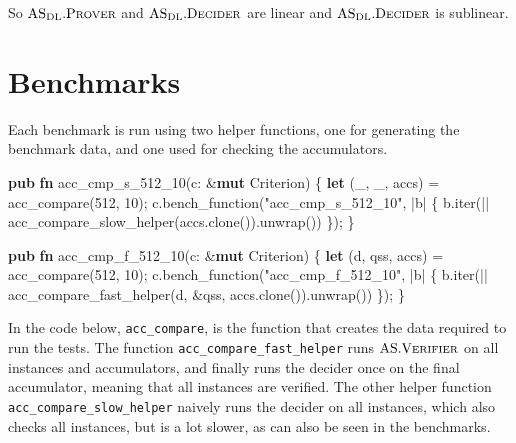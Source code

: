\documentclass[
]{article}
\newenvironment{Shaded}{\begin{snugshade}}{\end{snugshade}}
\newcommand{\DecValTok}[1]{\textcolor[rgb]{0.56,0.25,0.44}{#1}}
\newcommand{\KeywordTok}[1]{\textcolor[rgb]{0.80,0.14,0.11}{\textbf{#1}}}
\newcommand{\NormalTok}[1]{\textcolor[rgb]{0.16,0.16,0.16}{#1}}
\newcommand{\OperatorTok}[1]{\textcolor[rgb]{0.56,0.25,0.44}{#1}}
\newcommand{\StringTok}[1]{\textcolor[rgb]{0.60,0.59,0.10}{#1}}
\newcommand*{\Verifier}{\mathrm{\text{V\scriptsize ERIFIER}}}
\newcommand*{\AS}{\text{AS}}
\newcommand*{\ASVerifier}{\AS.\Verifier}
\newcommand*{\ASDL}{\text{AS}_{\text{DL}}}
\newcommand*{\ASDLProver}{\ASDL.\mathrm{\text{P\scriptsize ROVER}}}
\newcommand*{\ASDLDecider}{\ASDL.\mathrm{\text{D\scriptsize ECIDER}}}
\begin{document}
So \(\ASDLProver\) and \(\ASDLDecider\) are linear and \(\ASDLDecider\)
is sublinear.

\section{Benchmarks}\label{benchmarks}

Each benchmark is run using two helper functions, one for generating the
benchmark data, and one used for checking the accumulators.

\begin{Shaded}
\begin{Highlighting}[numbers=left,,]
  \KeywordTok{pub} \KeywordTok{fn}\NormalTok{ acc\_cmp\_s\_512\_10(c}\OperatorTok{:} \OperatorTok{\&}\KeywordTok{mut}\NormalTok{ Criterion) }\OperatorTok{\{}
      \KeywordTok{let}\NormalTok{ (\_}\OperatorTok{,}\NormalTok{ \_}\OperatorTok{,}\NormalTok{ accs) }\OperatorTok{=}\NormalTok{ acc\_compare(}\DecValTok{512}\OperatorTok{,} \DecValTok{10}\NormalTok{)}\OperatorTok{;}
\NormalTok{      c}\OperatorTok{.}\NormalTok{bench\_function(}\StringTok{"acc\_cmp\_s\_512\_10"}\OperatorTok{,} \OperatorTok{|}\NormalTok{b}\OperatorTok{|} \OperatorTok{\{}
\NormalTok{          b}\OperatorTok{.}\NormalTok{iter(}\OperatorTok{||}\NormalTok{ acc\_compare\_slow\_helper(accs}\OperatorTok{.}\NormalTok{clone())}\OperatorTok{.}\NormalTok{unwrap())}
      \OperatorTok{\}}\NormalTok{)}\OperatorTok{;}
  \OperatorTok{\}}

  \KeywordTok{pub} \KeywordTok{fn}\NormalTok{ acc\_cmp\_f\_512\_10(c}\OperatorTok{:} \OperatorTok{\&}\KeywordTok{mut}\NormalTok{ Criterion) }\OperatorTok{\{}
      \KeywordTok{let}\NormalTok{ (d}\OperatorTok{,}\NormalTok{ qss}\OperatorTok{,}\NormalTok{ accs) }\OperatorTok{=}\NormalTok{ acc\_compare(}\DecValTok{512}\OperatorTok{,} \DecValTok{10}\NormalTok{)}\OperatorTok{;}
\NormalTok{      c}\OperatorTok{.}\NormalTok{bench\_function(}\StringTok{"acc\_cmp\_f\_512\_10"}\OperatorTok{,} \OperatorTok{|}\NormalTok{b}\OperatorTok{|} \OperatorTok{\{}
\NormalTok{          b}\OperatorTok{.}\NormalTok{iter(}\OperatorTok{||}\NormalTok{ acc\_compare\_fast\_helper(d}\OperatorTok{,} \OperatorTok{\&}\NormalTok{qss}\OperatorTok{,}\NormalTok{ accs}\OperatorTok{.}\NormalTok{clone())}\OperatorTok{.}\NormalTok{unwrap())}
      \OperatorTok{\}}\NormalTok{)}\OperatorTok{;}
  \OperatorTok{\}}
\end{Highlighting}
\end{Shaded}

In the code below, \texttt{acc\_compare}, is the function that creates
the data required to run the tests. The function
\texttt{acc\_compare\_fast\_helper} runs \(\ASVerifier\) on all
instances and accumulators, and finally runs the decider once on the
final accumulator, meaning that all instances are verified. The other
helper function \texttt{acc\_compare\_slow\_helper} naively runs the
decider on all instances, which also checks all instances, but is a lot
slower, as can also be seen in the benchmarks.
\end{document}
